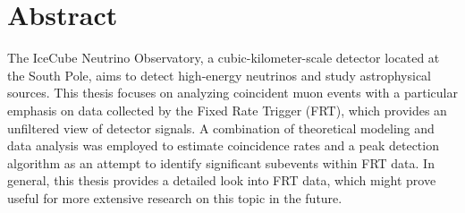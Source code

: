 

\section*{Abstract}
The IceCube Neutrino Observatory, a cubic-kilometer-scale detector located at the South Pole, aims to detect high-energy neutrinos and study astrophysical sources. 
This thesis focuses on analyzing coincident muon events with a particular emphasis on data collected by the Fixed Rate Trigger (FRT), which provides an unfiltered 
view of detector signals. A combination of theoretical modeling and data analysis was employed to estimate coincidence 
rates and a peak detection algorithm as an attempt to identify significant subevents within FRT data. In general, this thesis provides a detailed look into FRT data,
which might prove useful for more extensive research on this topic in the future. 

